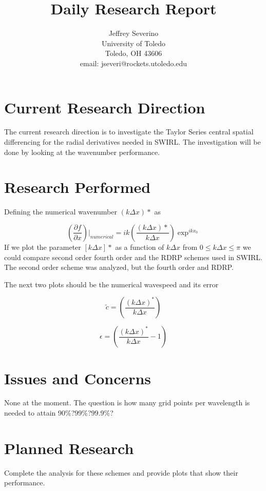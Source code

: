 \documentclass[a4paper]{article}
\begin{document}
\begin{titlepage}

    \title{
    Daily Research Report}

    \author{ Jeffrey Severino \\
        University of Toledo \\
        Toledo, OH  43606 \\
    email: jseveri@rockets.utoledo.edu}


    \maketitle

\end{titlepage}
\section{Current Research Direction}
The current research direction is to investigate the Taylor Series central spatial
differencing for the radial derivatives needed in SWIRL. The investigation will 
be done by looking at the wavenumber performance.
\section{Research Performed}
Defining the numerical wavenumber $(k \Delta x )*$ as 

\begin{equation}
    \left( \frac{\partial f}{\partial x} \right)|_{numerical}=
    ik \left( \frac{\left( k  \Delta x \right)*}{k \Delta x} \right) \exp^{ikx_0}
\end{equation}
If we plot the parameter $\left[ k \Delta x \right]*$ as a function of 
$k \Delta x $ from $0 \leq k \Delta x \leq \pi$ we could compare second order
fourth order and the RDRP schemes used in SWIRL. 
The second order scheme was analyzed, but the fourth order and RDRP.

The next two plots should be the numerical wavespeed and its error

\begin{equation}
    \tilde{c} = \left( \frac{\left( k \Delta x  \right)^*}{k \Delta x} \right) 
\end{equation}


\begin{equation}
    \epsilon = \left( \frac{\left( k \Delta x  \right)^*}{k \Delta x} - 1 \right) 
\end{equation}
\section{Issues and Concerns}
None at the moment. The question is how many grid points per wavelength is needed
to attain $90\%$?$99\%$?$99.9\%$?


\section{Planned Research}
Complete the analysis for these schemes and provide plots that show their performance.
\end{document}
